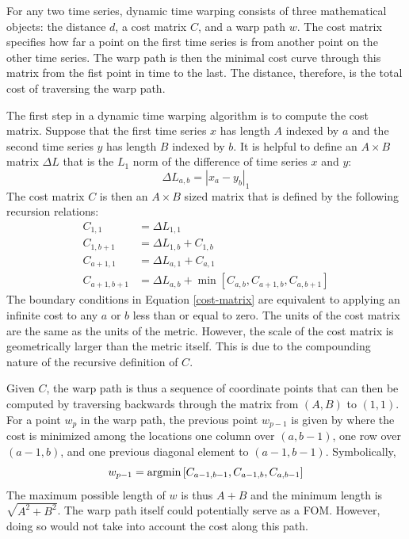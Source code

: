 For any two time series, dynamic time warping consists of three mathematical objects:
the distance $d$, a cost matrix $C$, and a warp path $w$. The cost matrix 
specifies how far a point on the first time series is from another point on the 
other time series.  The warp path is then the minimal cost curve through this 
matrix from the fist point in time to the last. The distance, therefore, is the
total cost of traversing the warp path.

The first step in a dynamic time warping algorithm is to compute the cost matrix. 
Suppose that the first 
time series $x$ has length $A$ indexed by $a$ and the second time series $y$ has 
length $B$ indexed by $b$. It is helpful to define an $A\times B$ matrix $\Delta L$
that is the $L_1$ norm of the difference of time series $x$ and $y$:
\begin{equation}
\label{delta-l1}
\Delta L_{a,b} = \left|x_a - y_b\right|_1
\end{equation}
The cost matrix $C$ is then an $A\times B$ sized matrix that is defined by the 
following recursion relations:
\begin{equation}
\label{cost-matrix}
\begin{split}
C_{1,1} & = \Delta L_{1,1}\\
C_{1,b+1} & = \Delta L_{1,b} + C_{1,b}\\
C_{a+1,1} & = \Delta L_{a,1} + C_{a,1}\\
C_{a+1,b+1} & = \Delta L_{a,b} + \min\left[C_{a,b}, C_{a+1,b}, C_{a,b+1}\right]
\end{split}
\end{equation}
The boundary conditions in Equation \ref{cost-matrix} are equivalent 
to applying an infinite cost to any $a$ or $b$ less than or equal to zero.
The units of the cost matrix are the same as the units of the metric. However, the 
scale of the cost matrix is geometrically larger than the metric itself. This is
due to the compounding nature of the recursive definition of $C$.

Given $C$, the warp path is thus a sequence of coordinate points that can then be 
computed by traversing backwards through the matrix from $(A, B)$ to $(1, 1)$.
For a point $w_p$ in the warp path, the previous point $w_{p-1}$ is given by 
where the cost is minimized among the locations one column over $(a,b-1)$, 
one row over $(a-1,b)$, and one previous diagonal element to $(a-1,b-1)$. 
Symbolically, 
\begin{equation}
\label{warp-path}
w_{p-1} = \mathrm{argmin}\left[C_{a-1,b-1}, C_{a-1,b}, C_{a,b-1}\right]
\end{equation}
The maximum possible length of $w$ is thus $A + B$ and the minimum length is 
$\sqrt{A^2 + B^2}$. The warp path itself could potentially serve as a FOM.  
However, doing so would not take into account the cost along this path.

